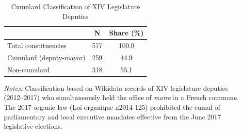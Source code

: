 \begin{table}[htbp]
\centering
\caption{Cumulard Classification of XIV Legislature Deputies}
\label{tab:treatment}
\begin{tabular}{lcc}
\hline\hline
 & N & Share (\%) \\
\hline
Total constituencies & 577 & 100.0 \\
\quad Cumulard (deputy-mayor) & 259 & 44.9 \\
\quad Non-cumulard & 318 & 55.1 \\
\hline\hline
\end{tabular}
\parbox{\textwidth}{\footnotesize \textit{Notes:} Classification based on Wikidata records of XIV legislature deputies (2012--2017) who simultaneously held the office of \textit{maire} in a French commune. The 2017 organic law (Loi organique n\textdegree{}2014-125) prohibited the cumul of parliamentary and local executive mandates effective from the June 2017 legislative elections.}
\end{table}

